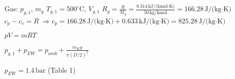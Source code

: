 Gas: \( p_{g,1} \), \( m_g \)  
\( T_{g,1} = 500^\circ \text{C} \), \( V_{g,1} \)  
\( R_g = \frac{R}{M_g} = \frac{8.314 \, \text{kJ/(kmol·K)}}{50 \, \text{kg/kmol}} = 166.28 \, \text{J/(kg·K)} \)  
\( c_p - c_v = R \)  
\( \Rightarrow c_p = 166.28 \, \text{J/(kg·K)} + 0.633 \, \text{kJ/(kg·K)} = 825.28 \, \text{J/(kg·K)} \)  

\( pV = mRT \)  

\( p_{g,1} + p_{EW} = p_{amb} + \frac{m_K g}{\pi (D/2)^2} \)  

\( p_{EW} = 1.4 \, \text{bar} \) (Table 1)